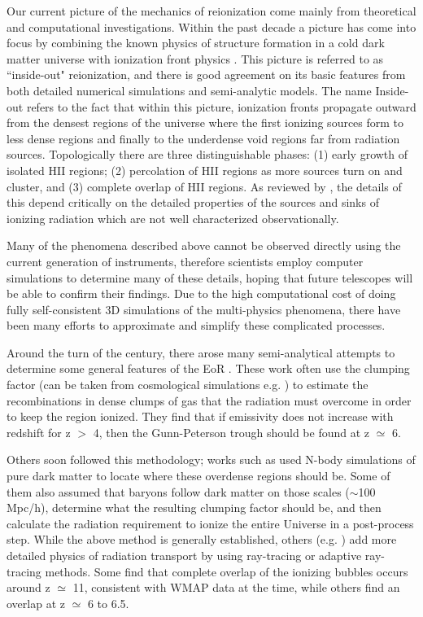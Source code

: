 Our current picture of the mechanics of reionization come mainly from theoretical and computational investigations. Within the past decade a picture has come into focus by combining the known physics of structure formation in a cold dark matter universe with
ionization front physics \citep{CiardiEtAl2003,IlievEtAl2006,TracGnedin2011}. This picture is referred to
as ``inside-out" reionization, and there is good agreement on its basic
features from both detailed numerical simulations and semi-analytic models.
The name Inside-out refers to the fact that within this picture, ionization fronts propagate
outward from the densest regions of the universe where the first ionizing
sources form to less dense regions and finally to the underdense void
regions far from radiation sources.
Topologically there are three distinguishable phases: (1) early
growth of isolated H{\footnotesize II} regions; (2) percolation of H{\footnotesize II} regions as more sources
turn on and cluster, and (3) complete overlap of H{\footnotesize II} regions. As reviewed by
\citep{TracGnedin2011}, the details of this depend critically
on the  detailed properties of the sources and sinks of ionizing radiation which are
not well characterized observationally. 

Many of the phenomena described above cannot be observed directly
using the current generation of instruments, therefore scientists
employ computer simulations to determine many of these details, hoping
that future telescopes will be able to confirm their findings.  Due to
the high computational cost of doing fully self-consistent 3D
simulations of the multi-physics phenomena, there have been many
efforts to approximate and simplify these complicated processes.

Around the turn of the century, there arose many semi-analytical 
attempts to determine some general features of the EoR  
\citep{ValageasSilk1999, MadauEtAl1999, MiraldaEscudeEtAl2000}.  
These work often use the clumping factor (can be taken from
cosmological simulations e.g. \citealt{GnedinOstriker1997}) to
estimate the recombinations in dense clumps of gas that the radiation
must overcome in order to keep the region ionized.  They find that if
emissivity does not increase with redshift for z $>$ 4, then the
Gunn-Peterson trough should be found at z $\simeq$ 6.  

Others soon followed this methodology; works such as 
\citep{CiardiEtAl2003, IlievEtAl2006, ZahnEtAl2007} used N-body
simulations of pure dark matter to locate where these overdense regions
should be.  Some of them also assumed that baryons follow dark matter on those
scales ($\sim$100 Mpc/h), determine what
the resulting clumping factor should be, and then calculate the
radiation requirement to ionize the entire Universe in a post-process
step.  While the above method is generally established, others
(e.g. \citealt{IlievEtAl2006, TracCen2007}) add more detailed physics
of radiation transport by using ray-tracing or adaptive ray-tracing
methods.  Some find that complete overlap of the ionizing bubbles
occurs around z $\simeq$ 11, consistent with WMAP data at the 
time, while others find an overlap at z $\simeq$ 6 to 6.5.  

